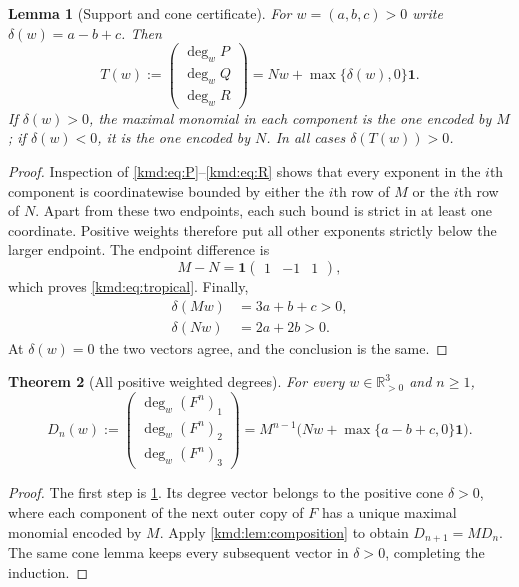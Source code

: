 \documentclass[11pt,a4paper]{article}
\numberwithin{equation}{section}
\newtheorem{theorem}{Theorem}[section]
\newtheorem{lemma}[theorem]{Lemma}
\theoremstyle{definition}
\theoremstyle{remark}
\newcommand{\R}{\mathbb R}
\newcommand{\one}{\mathbf 1}
\newcommand{\dd}{\operatorname{deg}}
\begin{document}
\begin{lemma}[Support and cone certificate]\label{kmd:lem:cone}
For $w=(a,b,c)>0$ write $\delta(w)=a-b+c$. Then
\begin{equation}
 T(w):=\begin{pmatrix}\dd_wP\\\dd_wQ\\\dd_wR\end{pmatrix}
 =Nw+\max\{\delta(w),0\}\one.
 \label{kmd:eq:tropical}
\end{equation}
If $\delta(w)>0$, the maximal monomial in each component is the one
encoded by $M$; if $\delta(w)<0$, it is the one encoded by $N$.
In all cases $\delta(T(w))>0$.
\end{lemma}
\begin{proof}
Inspection of \eqref{kmd:eq:P}--\eqref{kmd:eq:R} shows that every exponent
in the $i$th component is coordinatewise bounded by either the $i$th
row of $M$ or the $i$th row of $N$. Apart from these two endpoints,
each such bound is strict in at least one coordinate. Positive
weights therefore put all other exponents strictly below the larger
endpoint. The endpoint difference is
\[
 M-N=\one\begin{pmatrix}1&-1&1\end{pmatrix},
\]
which proves \eqref{kmd:eq:tropical}. Finally,
\begin{align*}
 \delta(Mw)&=3a+b+c>0,\\
 \delta(Nw)&=2a+2b>0.
\end{align*}
At $\delta(w)=0$ the two vectors agree, and the conclusion is the same.
\end{proof}

\begin{theorem}[All positive weighted degrees]\label{kmd:thm:weighted}
For every $w\in\R_{>0}^3$ and $n\ge1$,
\begin{equation}
 D_n(w):=\begin{pmatrix}\dd_w(F^n)_1\\\dd_w(F^n)_2\\\dd_w(F^n)_3\end{pmatrix}
 =M^{n-1}\bigl(Nw+\max\{a-b+c,0\}\one\bigr).
 \label{kmd:eq:all-weighted}
\end{equation}
\end{theorem}
\begin{proof}
The first step is \cref{kmd:lem:cone}. Its degree vector belongs to the
positive cone $\delta>0$, where each component of the next outer copy
of $F$ has a unique maximal monomial encoded by $M$. Apply
\cref{kmd:lem:composition} to obtain $D_{n+1}=MD_n$. The same cone lemma
keeps every subsequent vector in $\delta>0$, completing the induction.
\end{proof}
\end{document}

